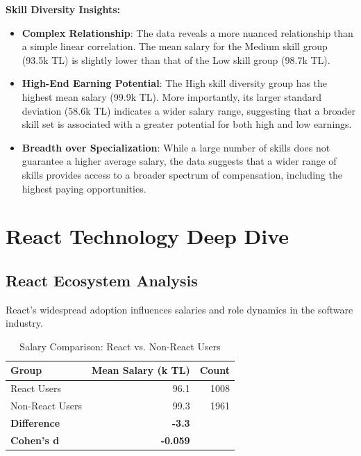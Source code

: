 \documentclass[12pt,a4paper]{article}
\begin{document}
\textbf{Skill Diversity Insights:}
\begin{itemize}
	\item \textbf{Complex Relationship}: The data reveals a more nuanced relationship than a simple linear correlation. The mean salary for the Medium skill group (93.5k TL) is slightly lower than that of the Low skill group (98.7k TL).
	\item \textbf{High-End Earning Potential}: The High skill diversity group has the highest mean salary (99.9k TL). More importantly, its larger standard deviation (58.6k TL) indicates a wider salary range, suggesting that a broader skill set is associated with a greater potential for both high and low earnings.
	\item \textbf{Breadth over Specialization}: While a large number of skills does not guarantee a higher average salary, the data suggests that a wider range of skills provides access to a broader spectrum of compensation, including the highest paying opportunities.
\end{itemize}

\section{React Technology Deep Dive}

\subsection{React Ecosystem Analysis}
React’s widespread adoption influences salaries and role dynamics in the software industry.

\begin{table}[H]
	\centering
	\small
	\begin{tabular}{lrr}
		\toprule
		\textbf{Group}       & \textbf{Mean Salary (k TL)} & \textbf{Count} \\
		\midrule
		React Users          & 96.1                        & 1008           \\
		Non-React Users      & 99.3                        & 1961           \\
		\midrule
		\textbf{Difference}  & \textbf{-3.3}               &                \\
		\textbf{Cohen’s d} & \textbf{-0.059}             &                \\
		\bottomrule
	\end{tabular}
	\caption{Salary Comparison: React vs. Non-React Users}
\end{table}
\end{document}
